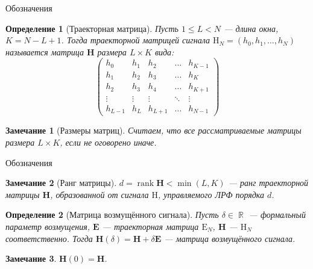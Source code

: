 \documentclass[notheorems, handout]{beamer}
\newtheorem{remark}{Замечание}
\newtheorem{definition}{Определение}
\DeclareMathOperator{\R}{\mathbb{R}}
\DeclareMathOperator{\rank}{\mathrm{rank}}
\begin{document}
	\begin{frame}{Обозначения}
		\begin{definition}[Траекторная матрица]
			Пусть $1\leqslant L < N$ --- длина окна, $K=N-L+1$. Тогда траекторной матрицей сигнала $\mathrm{H}_N = (h_0, h_1, \dots, h_N)$ называется матрица $\mathbf{H}$ размера $L\times K$ вида:
			\begin{equation*}
				\begin{pmatrix}
					h_0&h_1&h_2&\dots&h_{K-1}\\
					h_1&h_2&h_3&\dots&h_K\\
					h_2&h_3&h_4&\dots&h_{K+1}\\
					\vdots&\vdots&\vdots&\ddots&\vdots\\
					h_{L-1}&h_L&h_{L+1}&\dots&h_{N-1}
				\end{pmatrix}
			\end{equation*}
		\end{definition}
		\begin{remark}[Размеры матриц]
			Считаем, что все рассматриваемые матрицы размера $L\times K$, если не оговорено иначе.	
		\end{remark}
	\end{frame}
	\begin{frame}{Обозначения}
		\begin{remark}[Ранг матрицы]
			$d = \rank\mathbf{H} < \min(L, K)$ --- ранг траекторной матрицы $\mathbf{H}$, образованной от сигнала $\mathrm{H}$, управляемого ЛРФ порядка $d$.
		\end{remark}
		\begin{definition}[Матрица возмущённого сигнала]
			Пусть $\delta\in\R$ --- формальный параметр возмущения, $\mathbf{E}$ --- траекторная матрица $\mathrm{E}_N$, $\mathbf{H}$ --- $\mathrm{H}_N$ соответственно.  Тогда $\mathbf{H}(\delta) = \mathbf{H} + \delta\mathbf{E}$ --- матрица возмущённого сигнала.
		\end{definition}
		\begin{remark}
			$\mathbf{H}(0) = \mathbf{H}$.
		\end{remark}
	\end{frame}
\end{document}
